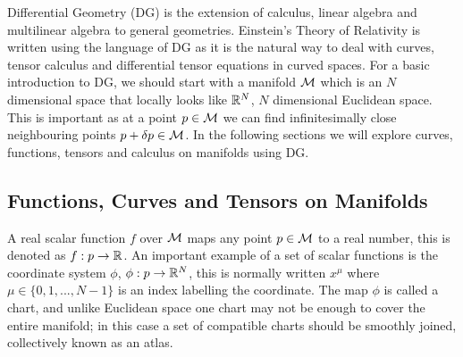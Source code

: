 Differential Geometry (DG) is the extension of calculus, linear algebra and multilinear algebra to general
geometries. Einstein’s Theory of Relativity is written using the language of DG as it is the natural
way to deal with curves, tensor calculus and differential tensor equations in curved spaces. For a basic
introduction to DG, we should start with a manifold $\mathcal{M}$ which is an $N$ dimensional space that locally looks
like $\mathbb{R}^N$, $N$ dimensional Euclidean space. This is important as at a point $p\in\mathcal{M}$ we can find infinitesimally
close neighbouring points $p + \delta p \in \mathcal{M}$. In the following sections we will explore curves, functions, tensors and calculus on manifolds using DG.




\subsection{Functions, Curves and Tensors on Manifolds}
A real scalar function $f$ over $\mathcal{M}$ maps any point $p\in \mathcal{M}$ to a real number, this is denoted as
$f : p \rightarrow \mathbb{R}$. An important example of a set of scalar functions is the coordinate system $\phi$, $\phi : p \rightarrow \mathbb{R}^N$,
this is normally written $x^\mu$ where $\mu\in\{0,1,...,N-1\}$ is an index labelling the coordinate. The map $\phi$ is called a chart,
and unlike Euclidean space one chart may not be enough to cover the entire manifold; in this case a set
of compatible charts should be smoothly joined, collectively known as an atlas.


